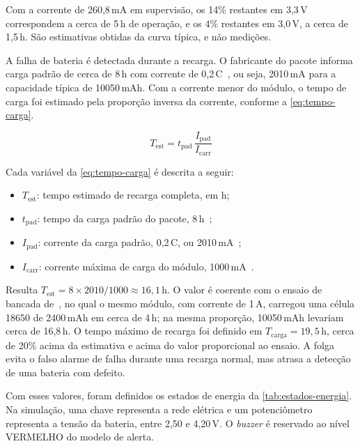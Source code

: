 Com a corrente de 260,8\,mA em supervisão, os 14\% restantes em 3,3\,V
correspondem a cerca de 5\,h de operação, e os 4\% restantes em 3,0\,V, a
cerca de 1,5\,h. São estimativas obtidas da curva típica, e não medições.

A falha de bateria é detectada durante a recarga. O fabricante do pacote
informa carga padrão de cerca de 8\,h com corrente de 0,2\,C~\cite{adafruit_5035}, ou seja, 2010\,mA para a capacidade típica de
10050\,mAh. Com a corrente menor do módulo, o tempo de carga foi estimado
pela proporção inversa da corrente, conforme a
\autoref{eq:tempo-carga}.

\begin{equation}
\label{eq:tempo-carga}
T_{\mathrm{est}} = t_{\mathrm{pad}}\,
\frac{I_{\mathrm{pad}}}{I_{\mathrm{carr}}}
\end{equation}

Cada variável da \autoref{eq:tempo-carga} é descrita a seguir:

\begin{itemize}
  \item $T_{\mathrm{est}}$: tempo estimado de recarga completa, em h;
  \item $t_{\mathrm{pad}}$: tempo da carga padrão do pacote, 8\,h~\cite{adafruit_5035};
  \item $I_{\mathrm{pad}}$: corrente da carga padrão, 0,2\,C, ou
        2010\,mA~\cite{adafruit_5035};
  \item $I_{\mathrm{carr}}$: corrente máxima de carga do módulo,
        1000\,mA~\cite{adafruit_2465_produto}.
\end{itemize}

Resulta $T_{\mathrm{est}} = 8 \times 2010 / 1000 \approx 16{,}1$\,h. O
valor é coerente com o ensaio de bancada de~, no
qual o mesmo módulo, com corrente de 1\,A, carregou uma célula 18650 de
2400\,mAh em cerca de 4\,h; na mesma proporção, 10050\,mAh levariam cerca
de 16,8\,h.
O tempo máximo de recarga foi definido em $T_{\mathrm{carga}} = 19{,}5$\,h,
cerca de 20\% acima da estimativa e acima do valor proporcional ao
ensaio. A folga evita o falso alarme de falha durante uma recarga normal,
mas atrasa a detecção de uma bateria com defeito.

Com esses valores, foram definidos os estados de energia da
\autoref{tab:estados-energia}. Na simulação, uma chave representa a rede
elétrica e um potenciômetro representa a tensão da bateria, entre 2,50 e
4,20\,V. O \textit{buzzer} é reservado ao nível VERMELHO do modelo de
alerta.

